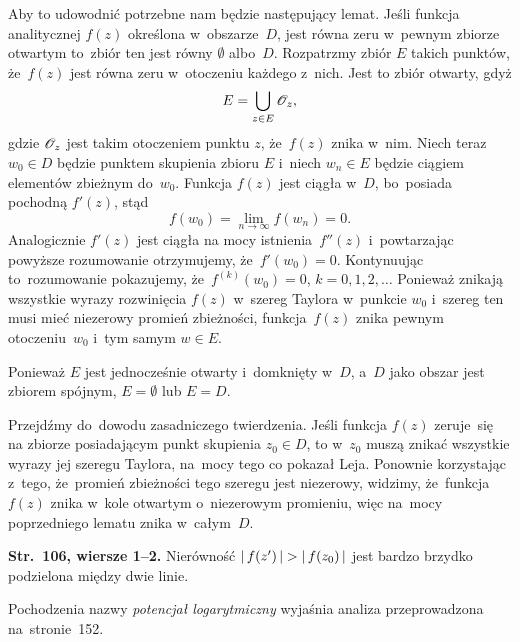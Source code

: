 \documentclass[a4paper,11pt]{article}
\begin{document}
Aby to udowodnić potrzebne nam będzie następujący lemat. Jeśli funkcja
analitycznej $f( z )$ określona w~obszarze~$D$, jest równa zeru
w~pewnym zbiorze otwartym to~zbiór ten jest równy $\emptyset$
albo~$D$. Rozpatrzmy zbiór $E$ takich punktów, że~$f( z )$ jest równa
zeru w~otoczeniu każdego z~nich. Jest to zbiór otwarty, gdyż
\begin{equation}
  \label{eq:Leja-44}
  E = \bigcup_{ z \in E } \mathcal{O}_{ z },
\end{equation}
gdzie $\mathcal{O}_{ z }$ jest takim otoczeniem punktu $z$, że~$f( z )$ znika
w~nim. Niech teraz $w_{ 0 } \in D$ będzie punktem skupienia zbioru $E$
i~niech $w_{ n } \in E$ będzie ciągiem elementów zbieżnym
do~$w_{ 0 }$. Funkcja $f( z )$ jest ciągła w~$D$, bo~posiada pochodną
$f'( z )$, stąd
\begin{equation}
  \label{eq:Leja-45}
  f( w_{ 0 } ) = \lim\limits_{ n \to \infty } f( w_{ n } ) = 0.
\end{equation}
Analogicznie $f'( z )$ jest ciągła na mocy istnienia~$f''( z )$
i~powtarzając powyższe rozumowanie otrzymujemy,
że~$f'( w_{ 0 } ) = 0$. Kontynuując to~rozumowanie pokazujemy,
że~$f^{ ( k ) }( w_{ 0 } ) = 0$, $k = 0, 1, 2, \ldots$ Ponieważ znikają
wszystkie wyrazy rozwinięcia $f( z )$ w~szereg Taylora w~punkcie
$w_{ 0 }$ i~szereg ten musi mieć niezerowy promień zbieżności,
funkcja~$f( z )$ znika pewnym otoczeniu~$w_{ 0 }$ i~tym samym $w \in E$.

Ponieważ $E$ jest jednocześnie otwarty i~domknięty w~$D$, a~$D$ jako
obszar jest zbiorem spójnym, $E = \emptyset$ lub $E = D$.

Przejdźmy do~dowodu zasadniczego twierdzenia. Jeśli funkcja $f( z )$
zeruje~się na zbiorze posiadającym punkt skupienia $z_{ 0 } \in D$, to
w~$z_{ 0 }$ muszą znikać wszystkie wyrazy jej szeregu Taylora, na~mocy
tego co pokazał Leja. Ponownie korzystając z~tego, że~promień
zbieżności tego szeregu jest niezerowy, widzimy, że~funkcja~$f( z )$
znika w~kole otwartym o~niezerowym promieniu, więc na~mocy
poprzedniego lematu znika w~całym~$D$.

\vspace{\spaceFour}



\start \textbf{Str.~106, wiersze 1--2.} Nierówność
$|\, {  f( z' )  } \,| > |\, {  f( z_{ 0 } )  } \,|$ jest bardzo brzydko
podzielona między dwie linie.

\vspace{\spaceFour}



\start {} Pochodzenia nazwy \textit{potencjał logarytmiczny}
wyjaśnia analiza przeprowadzona na~stronie~152.
\end{document}
